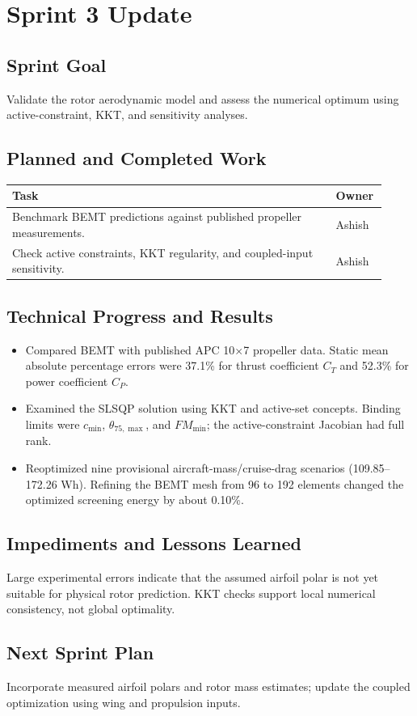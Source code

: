 \documentclass[10pt]{article}
\begin{document}
\section*{Sprint 3 Update}
\subsection*{Sprint Goal}
Validate the rotor aerodynamic model and assess the numerical optimum
using active-constraint, KKT, and sensitivity analyses.
\subsection*{Planned and Completed Work}
\begin{table}[htbp]
\centering
\renewcommand{\arraystretch}{1.05}
\setlength{\tabcolsep}{4pt}
\begin{tabular}{@{}p{0.82\linewidth}p{0.10\linewidth}@{}}
\toprule
\textbf{Task} & \textbf{Owner} \\
\midrule
Benchmark BEMT predictions against published propeller measurements. & Ashish \\
Check active constraints, KKT regularity, and coupled-input sensitivity. & Ashish \\
\bottomrule
\end{tabular}
\end{table}
\subsection*{Technical Progress and Results}
\begin{itemize}[leftmargin=*,nosep]
\item Compared BEMT with published APC 10$\times$7 propeller
data. Static mean absolute percentage errors were 37.1\% for thrust
coefficient $C_T$ and 52.3\% for power coefficient $C_P$.
\item Examined the SLSQP solution using KKT and active-set concepts.
Binding limits were $c_{\min}$, $\theta_{75,\max}$, and $FM_{\min}$;
the active-constraint Jacobian had full rank.
\item Reoptimized nine provisional aircraft-mass/cruise-drag scenarios
(109.85--172.26 Wh). Refining the BEMT mesh from 96 to 192
elements changed the optimized screening energy by about 0.10\%.
\end{itemize}
\subsection*{Impediments and Lessons Learned}
Large experimental errors indicate that the assumed airfoil polar
is not yet suitable for physical rotor prediction. KKT checks
support local numerical consistency, not global optimality.
\subsection*{Next Sprint Plan}
Incorporate measured airfoil polars and rotor mass estimates;
update the coupled optimization using wing and propulsion inputs.
\end{document}
